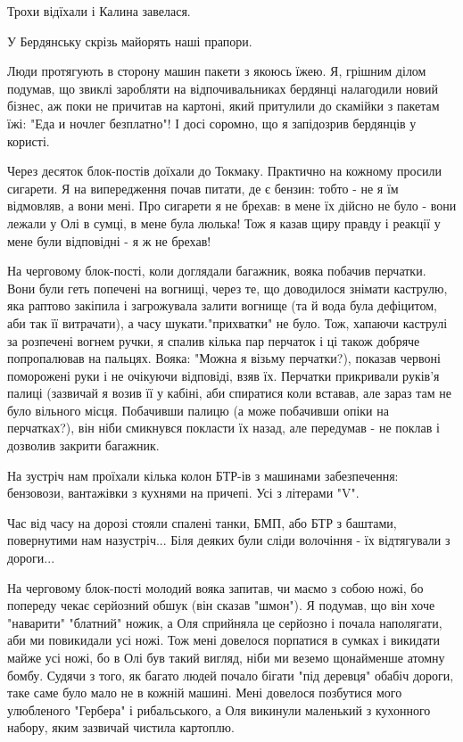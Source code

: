 Трохи відїхали і Калина завелася.

У Бердянську скрізь майорять наші прапори.

Люди протягують в сторону машин пакети з якоюсь їжею. Я, грішним ділом подумав,
що звиклі заробляти на відпочивальниках бердянці налагодили новий бізнес, аж
поки не причитав на картоні, який притулили до скамійки з пакетам їжі: "Еда и
ночлег безплатно"! І досі соромно, що я запідозрив бердянців у користі. 

Через десяток блок-постів доїхали до Токмаку. Практично на кожному просили
сигарети. Я на випередження почав питати, де є бензин: тобто - не я їм
відмовляв, а вони мені. Про сигарети я не брехав: в мене їх дійсно не було -
вони лежали у Олі в сумці, в мене була люлька! Тож я казав щиру правду і
реакції у мене були відповідні - я ж не брехав!

На черговому блок-пості, коли доглядали багажник, вояка побачив перчатки. Вони
були геть попечені на вогнищі, через те, що доводилося знімати каструлю, яка
раптово закіпила і загрожувала залити вогнище (та й вода була дефіцитом, аби
так її витрачати), а часу шукати."прихватки" не було. Тож, хапаючи каструлі за
розпечені вогнем ручки, я спалив кілька пар перчаток і ці також добряче
попропалював на пальцях. Вояка: "Можна я візьму перчатки?),  показав червоні
поморожені руки і не очікуючи відповіді, взяв їх. Перчатки прикривали руків'я
палиці (зазвичай я возив її у кабіні, аби спиратися коли вставав, але зараз там
не було вільного місця. Побачивши палицю (а може побачивши опіки на
перчатках?), він ніби смикнувся покласти їх назад, але передумав - не поклав і
дозволив закрити багажник.

На зустріч нам проїхали кілька колон БТР-ів з машинами забезпечення:
бензовози, вантажівки з кухнями на причепі. Усі з літерами "V".

Час від часу на дорозі стояли спалені танки,  БМП, або БТР з баштами,
повернутими нам назустріч... Біля деяких були сліди волочіння - їх відтягували
з дороги...

На черговому блок-пості молодий вояка запитав, чи маємо з собою ножі, бо
попереду чекає серйозний обшук (він сказав "шмон"). Я подумав, що він хоче
"наварити" "блатний" ножик, а Оля сприйняла це серйозно і почала наполягати,
аби ми повикидали усі ножі. Тож мені довелося порпатися в сумках і викидати
майже усі ножі, бо в Олі був такий вигляд, ніби ми веземо щонайменше атомну
бомбу. Судячи з того, як багато людей почало бігати "під деревця" обабіч
дороги, таке саме було мало не в кожній машині. Мені довелося позбутися мого
улюбленого "Гербера" і рибальського, а Оля викинули маленький з кухонного
набору, яким зазвичай  чистила картоплю. 

